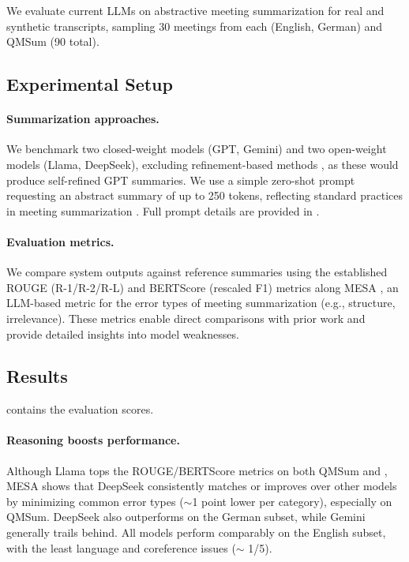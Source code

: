 \label{sec:experiments}


We evaluate current LLMs on abstractive meeting summarization for real and synthetic transcripts, sampling 30 meetings from each \dataset{} (English, German) and QMSum (90 total).


\subsection{Experimental Setup}
\paragraph{Summarization approaches.} 
We benchmark two closed-weight models (GPT, Gemini) and two open-weight models (Llama, DeepSeek), excluding refinement-based methods \cite{KirsteinLG25a}, as these would produce self-refined GPT summaries.
We use a simple zero-shot prompt requesting an abstract summary of up to 250 tokens, reflecting standard practices in meeting summarization \cite{KirsteinLG25a}.
Full prompt details are provided in .


\paragraph{Evaluation metrics.}
We compare system outputs against reference summaries using the established ROUGE (R-1/R-2/R-L) \cite{Lin04} and BERTScore (rescaled F1) \cite{ZhangKWW20} metrics along MESA \cite{KirsteinLG25}, an LLM-based metric for the error types of meeting summarization (e.g., structure, irrelevance).
These metrics enable direct comparisons with prior work and provide detailed insights into model weaknesses.





\subsection{Results}
\label{subsec:results_summ}

 contains the evaluation scores.

\paragraph{Reasoning boosts performance.}
Although Llama tops the ROUGE/BERTScore metrics on both QMSum and \dataset{}, MESA shows that DeepSeek consistently matches or improves over other models by minimizing common error types ($\sim$1 point lower per category), especially on QMSum.
DeepSeek also outperforms on the German \dataset{} subset, while Gemini generally trails behind.
All models perform comparably on the English subset, with the least language and coreference issues ($\sim$ 1/5).


